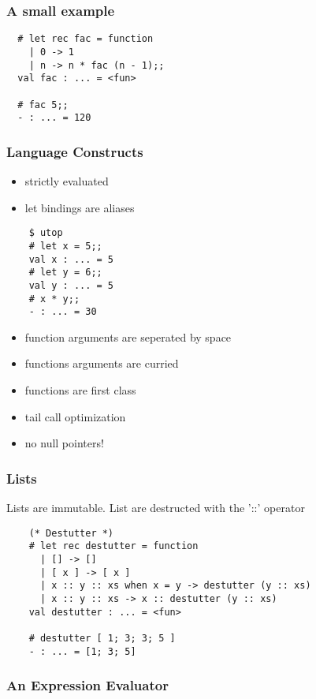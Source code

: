 \documentclass[mathserif,xcolor=svgnames]{beamer}
\renewcommand{\_}{\mathunderscore}
\begin{document}
\begin{frame}[fragile]
  \frametitle{A small example}
  \begin{lstlisting}
  # let rec fac = function
    | 0 -> 1
    | n -> n * fac (n - 1);;
  val fac : ... = <fun>

  # fac 5;;
  - : ... = 120

  \end{lstlisting}
\end{frame}

\begin{frame}[fragile]
  \frametitle{Language Constructs}
  \begin{itemize}
    \item strictly evaluated
    \item let bindings are aliases
  \end{itemize}

  \begin{lstlisting}
    $ utop
    # let x = 5;;
    val x : ... = 5
    # let y = 6;;
    val y : ... = 5
    # x * y;;
    - : ... = 30
  \end{lstlisting}

  \begin{itemize}
    \item function arguments are seperated by space
    \item functions arguments are curried
    \item functions are first class
    \item tail call optimization
    \item no null pointers!
  \end{itemize}
\end{frame}

\begin{frame}[fragile]
  \frametitle{Lists}
  Lists are immutable.
  List are destructed with the '::' operator
  \begin{lstlisting}
    (* Destutter *)
    # let rec destutter = function
      | [] -> []
      | [ x ] -> [ x ]
      | x :: y :: xs when x = y -> destutter (y :: xs)
      | x :: y :: xs -> x :: destutter (y :: xs)
    val destutter : ... = <fun>

    # destutter [ 1; 3; 3; 5 ]
    - : ... = [1; 3; 5]
  \end{lstlisting}

\end{frame}


\begin{frame}[fragile]
  \frametitle{An Expression Evaluator}
  
\end{frame}
\end{document}
